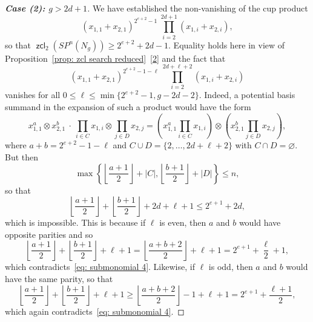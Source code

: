 \documentclass[amscd,amssymb,verbatim,10pt]{amsart}
\numberwithin{equation}{section}
\theoremstyle{plain}
\theoremstyle{definition}
\DeclareMathOperator{\zcl}{{\mathsf{zcl}}}
\DeclareMathOperator{\proj}{{\textup{proj}}}
\begin{document}
\begin{proof}[\textbf{Case (2): $g> 2d+1$}]
We have established the non-vanishing of the cup product
\[
\left(x_{1,1}+x_{2,1}\right)^{2^{e+2}-1}\ \prod_{i=2}^{2d+1} \left(x_{1,i}+x_{2,i}\right), \]
so that $\zcl_2(SP^n(N_g))\ge 2^{e+2}+2d-1$. Equality holds here in view of Proposition~\ref{prop: zcl search reduced}~\eqref{2} and the fact that
\[
\left(x_{1,1}+x_{2,1}\right)^{2^{e+2}-1-\ell}\ \prod_{i=2}^{2d+\ell+2} \left(x_{1,i}+x_{2,i}\right)   
\]
vanishes for all $0\le\ell\le\min\{2^{e+2}-1,g-2d-2\}$. Indeed, a potential basis summand in the expansion of such a product would have the form
\[
    x_{1,1}^a\otimes  x_{2,1}^b \ \cdot\ \prod_{i\in C} x_{1,i}\otimes \prod_{j\in D}x_{2,j}= \left(x_{1,1}^a\prod_{i\in C} x_{1,i}\right) \otimes \left(x_{2,1}^b \prod_{j\in D}x_{2,j}\right),
\]
where $a+b=2^{e+2}-1-\ell$ and $C\cup D=\{2,\ldots,2d+\ell+2\}$ with $C\cap D=\varnothing$. But then
\[
\max\left\{\left\lfloor \frac{a+1}{2} \right\rfloor+|C|, \left\lfloor \frac{b+1}{2} \right\rfloor+|D| \right\} \le n,
\] 
so that
\begin{equation}\label{eq: submonomial 4}
\left\lfloor \frac{a+1}{2} \right\rfloor + \left\lfloor \frac{b+1}{2} \right\rfloor + 2d+\ell+1\le 2^{e+1}+2d,    
\end{equation}
which is impossible. This is because if $\ell$ is even, then $a$ and $b$ would have opposite parities and so
\[
\left\lfloor \frac{a+1}{2} \right\rfloor + \left\lfloor \frac{b+1}{2} \right\rfloor +\ell+1=\left\lfloor \frac{a+b+2}{2} \right\rfloor +\ell+1 = 2^{e+1}+\frac{\ell}{2}+1,
\]
which contradicts~\eqref{eq: submonomial 4}. Likewise, if $\ell$ is odd, then $a$ and $b$ would have the same parity, so that
\[
\left\lfloor \frac{a+1}{2} \right\rfloor + \left\lfloor \frac{b+1}{2} \right\rfloor +\ell+1\ge \left\lfloor \frac{a+b+2}{2} \right\rfloor -1 + \ell +1= 2^{e+1}+\frac{\ell+1}{2},
\]
which again contradicts~\eqref{eq: submonomial 4}.
\end{proof}
\end{document}
